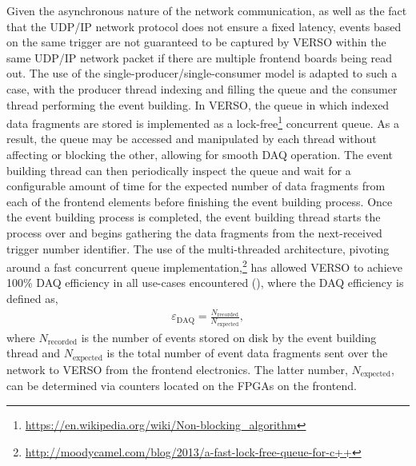 Given the asynchronous nature of the network communication, as well as the fact that the UDP/IP
network protocol does not ensure a fixed latency, events based on the same trigger
are not guaranteed to be captured by VERSO within the same UDP/IP network packet if there are multiple frontend boards being read out.
The use of the single-producer/single-consumer model is adapted to such a case, with
the producer thread indexing and filling the queue and the consumer thread performing the event building.
In VERSO, the queue in which indexed data fragments are stored is implemented
as a lock-free\footnote{\url{https://en.wikipedia.org/wiki/Non-blocking_algorithm}} concurrent queue.
As a result, the queue may be accessed and manipulated by each thread without affecting or blocking
the other, allowing for smooth DAQ operation.
The event building thread can then periodically inspect the queue and wait for a configurable amount of time for the expected
number of data fragments from each of the frontend elements before finishing
the event building process.
Once the event building process is completed,
the event building thread starts the process over and begins gathering the data fragments from the next-received trigger number identifier.
The use of the multi-threaded architecture, pivoting around a fast concurrent queue
implementation,\footnote{\url{http://moodycamel.com/blog/2013/a-fast-lock-free-queue-for-c++}}
has allowed VERSO to achieve 100\% DAQ efficiency
in all use-cases encountered ({\color{red}{Section XXX for use-cases}}),
where the DAQ efficiency is defined as,
\begin{align}
    \varepsilon_{\text{DAQ}} = \frac{ N_{\text{recorded}} }{ N_{\text{expected}} },
    \label{eq:verso_daq_eff}
\end{align}
where $N_{\text{recorded}}$ is the number of events stored on disk by the event building
thread and $N_{\text{expected}}$ is the total number of event data fragments sent
over the network to VERSO from the frontend electronics.
The latter number, $N_{\text{expected}}$, can be determined via counters located
on the FPGAs on the frontend.

\FloatBarrier
